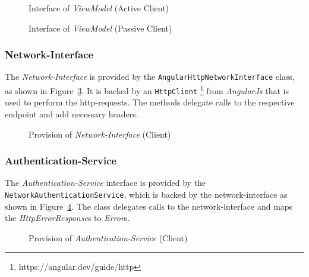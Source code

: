\begin{figure}
    \centering

    \caption{Interface of \textit{ViewModel} (Active Client)}
    \label{fig:active-viewmodel}
\end{figure}

\begin{figure}
    \centering

    \caption{Interface of \textit{ViewModel} (Passive Client)}
    \label{fig:passive-viewmodel}
\end{figure}

\subsubsection{Network-Interface}
The \textit{Network-Interface} is provided by the \texttt{AngularHttpNetworkInterface} class, as shown in Figure~\ref{fig:common-networkinterface-p}.
It is backed by an \texttt{HttpClient} \footnote{https://angular.dev/guide/http} from \textit{AngularJs} that is used to perform the http-requests.
The methods delegate calls to the respective endpoint and add necessary headers.

\begin{figure}
    \centering
    \caption{Provision of \textit{Network-Interface} (Client)}
    \label{fig:common-networkinterface-p}
\end{figure}

\subsubsection{Authentication-Service}
The \textit{Authentication-Service} interface is provided by the \texttt{NetworkAuthenticationService}, which is backed by the network-interface as shown in Figure~\ref{fig:common-authentication-service-p}.
The class delegates calls to the network-interface and maps the \textit{HttpErrorResponse}s to \textit{Error}s.

\begin{figure}
    \centering
    \caption{Provision of \textit{Authentication-Service} (Client)}
    \label{fig:common-authentication-service-p}
\end{figure}

